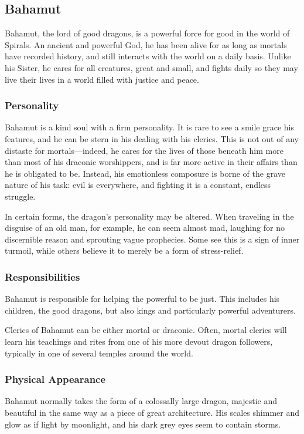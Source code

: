 \subsection*{Bahamut}
\begin{goddesc}
\end{goddesc}
Bahamut, the lord of good dragons, is a powerful force for good in the world of Spirals.
An ancient and powerful God, he has been alive for as long as mortals have recorded history, and still interacts with the world on a daily basis.
Unlike his Sister, he cares for all creatures, great and small, and fights daily so they may live their lives in a world filled with justice and peace.

\subsubsection*{Personality}
Bahamut is a kind soul with a firm personality.
It is rare to see a smile grace his features, and he can be stern in his dealing with his clerics.
This is not out of any distaste for mortals---indeed, he cares for the lives of those beneath him more than most of his draconic worshippers, and is far more active in their affairs than he is obligated to be.
Instead, his emotionless composure is borne of the grave nature of his task: evil is everywhere, and fighting it is a constant, endless struggle.

In certain forms, the dragon's personality may be altered.
When traveling in the disguise of an old man, for example, he can seem almost mad, laughing for no discernible reason and sprouting vague prophecies.
Some see this is a sign of inner turmoil, while others believe it to merely be a form of stress-relief.

\subsubsection*{Responsibilities}
Bahamut is responsible for helping the powerful to be just.
This includes his children, the good dragons, but also kings and particularly powerful adventurers.

Clerics of Bahamut can be either mortal or draconic.
Often, mortal clerics will learn his teachings and rites from one of his more devout dragon followers, typically in one of several temples around the world.

\subsubsection*{Physical Appearance}
Bahamut normally takes the form of a colossally large dragon, majestic and beautiful in the same way as a piece of great architecture.
His scales shimmer and glow as if light by moonlight, and his dark grey eyes seem to contain storms.

